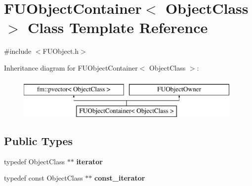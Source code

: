 \hypertarget{classFUObjectContainer}{
\section{FUObjectContainer$<$ ObjectClass $>$ Class Template Reference}
\label{classFUObjectContainer}
}


{\ttfamily \#include $<$FUObject.h$>$}

Inheritance diagram for FUObjectContainer$<$ ObjectClass $>$:\begin{figure}[H]
\begin{center}
\leavevmode
\includegraphics[height=2.000000cm]{classFUObjectContainer}
\end{center}
\end{figure}
\subsection*{Public Types}
\begin{DoxyCompactItemize}
\item 
\hypertarget{classFUObjectContainer_a97a68d6351d9cbb03cdf02138cffe822}{
typedef ObjectClass $\ast$$\ast$ {\bfseries iterator}}
\label{classFUObjectContainer_a97a68d6351d9cbb03cdf02138cffe822}

\item 
\hypertarget{classFUObjectContainer_accaa22e8a7435d4f62a2bd4b04beaf43}{
typedef const ObjectClass $\ast$$\ast$ {\bfseries const\_\-iterator}}
\label{classFUObjectContainer_accaa22e8a7435d4f62a2bd4b04beaf43}

\end{DoxyCompactItemize}

